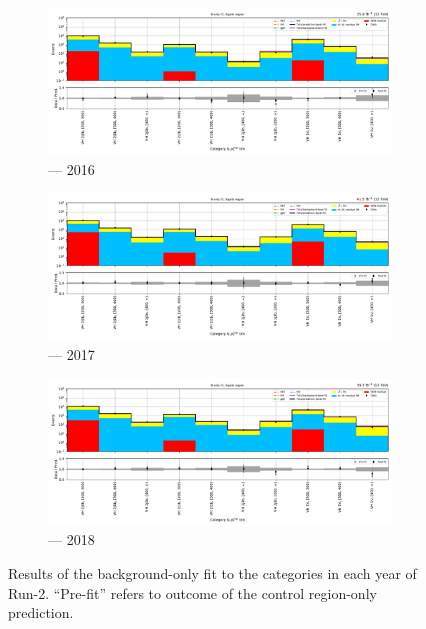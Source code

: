 \begin{figure}[htbp]
    \centering
    \begin{subfigure}[b]{0.79\textwidth}
        \includegraphics[width=\textwidth]{chapters/higgstoinv/figures/mountain_ranges/2016/VH/SR_tree_fit_b-abs_values_VH_cats.pdf}
        \caption{\VH --- 2016}
    \end{subfigure}

    \begin{subfigure}[b]{0.79\textwidth}
        \includegraphics[width=\textwidth]{chapters/higgstoinv/figures/mountain_ranges/2017/VH/SR_tree_fit_b-abs_values_VH_cats.pdf}
        \caption{\VH --- 2017}
    \end{subfigure}

    \begin{subfigure}[b]{0.79\textwidth}
        \includegraphics[width=\textwidth]{chapters/higgstoinv/figures/mountain_ranges/2018/VH/SR_tree_fit_b-abs_values_VH_cats.pdf}
        \caption{\VH --- 2018}
    \end{subfigure}
    \caption[Results of the background-only fit to the \VH categories in each year of Run-2]{Results of the background-only fit to the \VH categories in each year of Run-2. ``Pre-fit'' refers to outcome of the control region-only prediction.}
    \label{fig:htoinv_mountain_range_B_only_VH_SR}
\end{figure}

